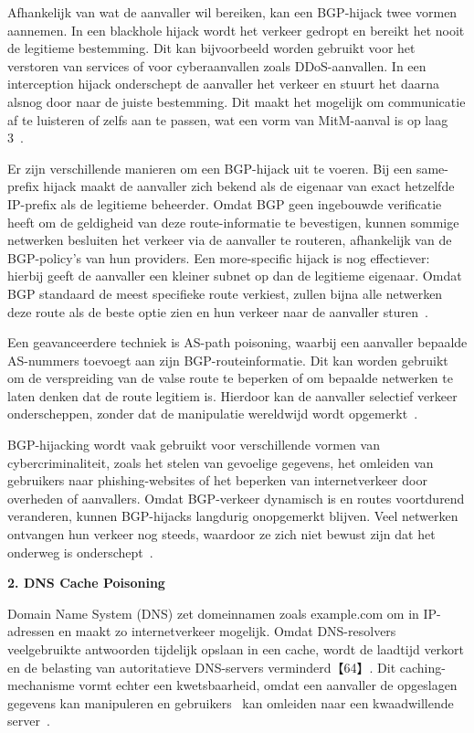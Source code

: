 Afhankelijk van wat de aanvaller wil bereiken, kan een BGP-hijack twee vormen aannemen. In een blackhole hijack wordt het verkeer gedropt en bereikt het nooit de legitieme bestemming. Dit kan bijvoorbeeld worden gebruikt voor het verstoren van services of voor cyberaanvallen zoals DDoS-aanvallen. In een interception hijack onderschept de aanvaller het verkeer en stuurt het daarna alsnog door naar de juiste bestemming. Dit maakt het mogelijk om communicatie af te luisteren of zelfs aan te passen, wat een vorm van MitM-aanval is op laag 3~\autocite{bühler2023}.


Er zijn verschillende manieren om een BGP-hijack uit te voeren. Bij een same-prefix hijack maakt de aanvaller zich bekend als de eigenaar van exact hetzelfde IP-prefix als de legitieme beheerder. Omdat BGP geen ingebouwde verificatie heeft om de geldigheid van deze route-informatie te bevestigen, kunnen sommige netwerken besluiten het verkeer via de aanvaller te routeren, afhankelijk van de BGP-policy’s van hun providers.
Een more-specific hijack is nog effectiever: hierbij geeft de aanvaller een kleiner subnet op dan de legitieme eigenaar. Omdat BGP standaard de meest specifieke route verkiest, zullen bijna alle netwerken deze route als de beste optie zien en hun verkeer naar de aanvaller sturen~\autocite{bühler2023}.


Een geavanceerdere techniek is AS-path poisoning, waarbij een aanvaller bepaalde AS-nummers toevoegt aan zijn BGP-routeinformatie. Dit kan worden gebruikt om de verspreiding van de valse route te beperken of om bepaalde netwerken te laten denken dat de route legitiem is. Hierdoor kan de aanvaller selectief verkeer onderscheppen, zonder dat de manipulatie wereldwijd wordt opgemerkt~\autocite{bühler2023}.


BGP-hijacking wordt vaak gebruikt voor verschillende vormen van cybercriminaliteit, zoals het stelen van gevoelige gegevens, het omleiden van gebruikers naar phishing-websites of het beperken van internetverkeer door overheden of aanvallers. Omdat BGP-verkeer dynamisch is en routes voortdurend veranderen, kunnen BGP-hijacks langdurig onopgemerkt blijven. Veel netwerken ontvangen hun verkeer nog steeds, waardoor ze zich niet bewust zijn dat het onderweg is onderschept~\autocite{bühler2023}.



\vspace{0.5cm}
\textbf{2. DNS Cache Poisoning}


Domain Name System (DNS) zet domeinnamen zoals example.com om in IP-adressen en maakt zo internetverkeer mogelijk. Omdat DNS-resolvers veelgebruikte antwoorden tijdelijk opslaan in een cache, wordt de laadtijd verkort en de belasting van autoritatieve DNS-servers verminderd【64】. Dit caching-mechanisme vormt echter een kwetsbaarheid, omdat een aanvaller de opgeslagen gegevens kan manipuleren en gebruikers  kan omleiden naar een kwaadwillende server~\autocite{klein2020}.

